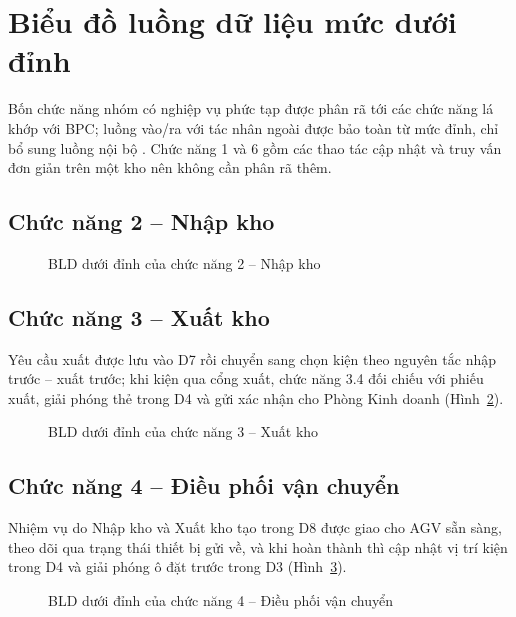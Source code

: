 \section{Biểu đồ luồng dữ liệu mức dưới đỉnh}
\label{sec:blddd}

Bốn chức năng nhóm có nghiệp vụ phức tạp được phân rã tới các chức năng lá khớp với BPC; luồng vào/ra với tác nhân ngoài được bảo toàn từ mức đỉnh, chỉ bổ sung luồng nội bộ \cite[Ch.~5]{tung_qlhttt}. Chức năng 1 và 6 gồm các thao tác cập nhật và truy vấn đơn giản trên một kho nên không cần phân rã thêm.

\subsection{Chức năng 2 -- Nhập kho}

\begin{figure}[H]
\centering
{}
\caption{BLD dưới đỉnh của chức năng 2 -- Nhập kho}
\label{fig:bldnhap}
\end{figure}

\subsection{Chức năng 3 -- Xuất kho}

Yêu cầu xuất được lưu vào D7 rồi chuyển sang chọn kiện theo nguyên tắc nhập trước -- xuất trước; khi kiện qua cổng xuất, chức năng 3.4 đối chiếu với phiếu xuất, giải phóng thẻ trong D4 và gửi xác nhận cho Phòng Kinh doanh (Hình~\ref{fig:bldxuat}).

\begin{figure}[H]
\centering
{}
\caption{BLD dưới đỉnh của chức năng 3 -- Xuất kho}
\label{fig:bldxuat}
\end{figure}

\subsection{Chức năng 4 -- Điều phối vận chuyển}

Nhiệm vụ do Nhập kho và Xuất kho tạo trong D8 được giao cho AGV sẵn sàng, theo dõi qua trạng thái thiết bị gửi về, và khi hoàn thành thì cập nhật vị trí kiện trong D4 và giải phóng ô đặt trước trong D3 (Hình~\ref{fig:blddieuphoi}).

\begin{figure}[H]
\centering
{}
\caption{BLD dưới đỉnh của chức năng 4 -- Điều phối vận chuyển}
\label{fig:blddieuphoi}
\end{figure}


